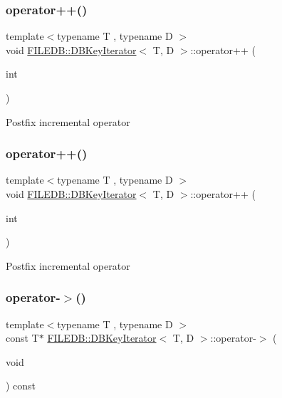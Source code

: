 \subsubsection{\texorpdfstring{operator++()}{operator++()}\hspace{0.1cm}{\footnotesize\ttfamily [3/4]}}
{\footnotesize\ttfamily template$<$typename T , typename D $>$ \\
void \mbox{\hyperlink{classFILEDB_1_1DBKeyIterator}{F\+I\+L\+E\+D\+B\+::\+D\+B\+Key\+Iterator}}$<$ T, D $>$\+::operator++ (\begin{DoxyParamCaption}\item[{int}]{ }\end{DoxyParamCaption})\hspace{0.3cm}{\ttfamily [inline]}}

Postfix incremental operator \mbox{\label{classFILEDB_1_1DBKeyIterator_a364ac0414da6888e0b981f07b3239257}} 
\subsubsection{\texorpdfstring{operator++()}{operator++()}\hspace{0.1cm}{\footnotesize\ttfamily [4/4]}}
{\footnotesize\ttfamily template$<$typename T , typename D $>$ \\
void \mbox{\hyperlink{classFILEDB_1_1DBKeyIterator}{F\+I\+L\+E\+D\+B\+::\+D\+B\+Key\+Iterator}}$<$ T, D $>$\+::operator++ (\begin{DoxyParamCaption}\item[{int}]{ }\end{DoxyParamCaption})\hspace{0.3cm}{\ttfamily [inline]}}

Postfix incremental operator \mbox{\label{classFILEDB_1_1DBKeyIterator_a453e5281ba078f217558d44c049c564c}} 
\subsubsection{\texorpdfstring{operator-\/$>$()}{operator->()}\hspace{0.1cm}{\footnotesize\ttfamily [1/2]}}
{\footnotesize\ttfamily template$<$typename T , typename D $>$ \\
const T$\ast$ \mbox{\hyperlink{classFILEDB_1_1DBKeyIterator}{F\+I\+L\+E\+D\+B\+::\+D\+B\+Key\+Iterator}}$<$ T, D $>$\+::operator-\/$>$ (\begin{DoxyParamCaption}\item[{void}]{ }\end{DoxyParamCaption}) const\hspace{0.3cm}{\ttfamily [inline]}}

